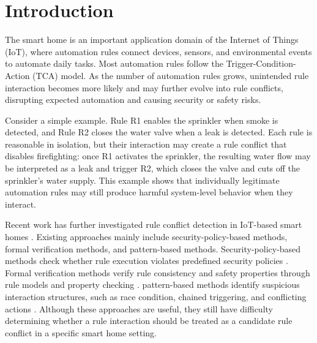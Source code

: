 \section{Introduction}

The smart home is an important application domain of the Internet of Things (IoT), where automation rules connect devices, sensors, and environmental events to automate daily tasks. Most automation rules follow the Trigger-Condition-Action (TCA) model. As the number of automation rules grows, unintended rule interaction becomes more likely and may further evolve into rule conflicts, disrupting expected automation and causing security or safety risks.

Consider a simple example. Rule R1 enables the sprinkler when smoke is detected, and Rule R2 closes the water valve when a leak is detected. Each rule is reasonable in isolation, but their interaction may create a rule conflict that disables firefighting: once R1 activates the sprinkler, the resulting water flow may be interpreted as a leak and trigger R2, which closes the valve and cuts off the sprinkler's water supply. This example shows that individually legitimate automation rules may still produce harmful system-level behavior when they interact.

Recent work has further investigated rule conflict detection in IoT-based smart homes \cite{huang2023survey,huang2021conflict,li2020diac,trimananda2020understanding,yagita2015application,chaki2020fine,yu2022tapinspector,pradeep2021automating}. Existing approaches mainly include security-policy-based methods, formal verification methods, and pattern-based methods. Security-policy-based methods check whether rule execution violates predefined security policies \cite{celik2018soteria,celik2019iotguard,ding2021iotsafe,hsu2019safechain}. Formal verification methods verify rule consistency and safety properties through rule models and property checking \cite{sun2014conflict,ibrhim2020formal,yu2022tapinspector}. pattern-based methods identify suspicious interaction structures, such as race condition, chained triggering, and conflicting actions \cite{alhanahnah2022iotcom,chi2020cross,chi2023detecting,li2020diac,xiao2019a3id,trimananda2020understanding,chaki2020fine}. Although these approaches are useful, they still have difficulty determining whether a rule interaction should be treated as a candidate rule conflict in a specific smart home setting.

